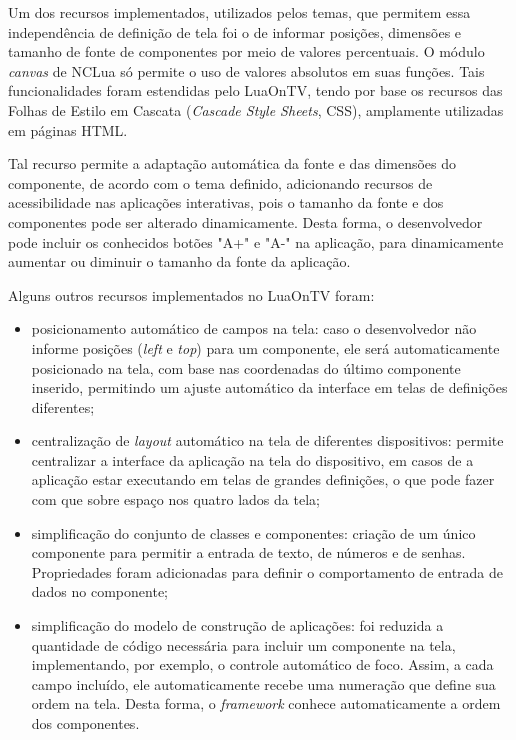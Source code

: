 Um dos recursos implementados, utilizados pelos temas, que permitem essa independência de definição
de tela foi o de informar posições, dimensões e tamanho de fonte de componentes
por meio de valores percentuais. O módulo \textit{canvas} de NCLua só permite 
o uso de valores absolutos em suas funções. Tais funcionalidades foram estendidas
pelo LuaOnTV, tendo por base os recursos das Folhas
de Estilo em Cascata (\textit{Cascade Style Sheets}, CSS)\cite{css2-spec},
amplamente utilizadas em páginas HTML.

Tal recurso permite a adaptação automática da fonte e das dimensões do componente,
de acordo com o tema definido, adicionando recursos de acessibilidade 
nas aplicações interativas, pois o tamanho da fonte e dos componentes
pode ser alterado dinamicamente. Desta forma, o desenvolvedor pode
incluir os conhecidos botões "A+" e "A-"  na aplicação, para dinamicamente
aumentar ou diminuir o tamanho da fonte da aplicação.

Alguns outros recursos implementados no LuaOnTV foram:

\begin{itemize}
	\item posicionamento automático de campos na tela: caso o desenvolvedor não informe posições (\textit{left} e \textit{top})
  para um componente, ele será automaticamente posicionado na tela, com base nas coordenadas do último componente
  inserido, permitindo um ajuste automático da interface em telas de definições diferentes;
  \item centralização de \textit{layout} automático na tela de diferentes dispositivos: permite centralizar
  a interface da aplicação na tela do dispositivo, em casos de a aplicação estar executando em telas
  de grandes definições, o que pode fazer com que sobre espaço nos quatro lados da tela;
  \item simplificação do conjunto de classes e componentes: criação de um único componente
  para permitir a entrada de texto, de números e de senhas. Propriedades foram adicionadas
  para definir o comportamento de entrada de dados no componente;
  \item simplificação do modelo de construção de aplicações: foi reduzida a quantidade de código
  necessária para incluir um componente na tela, implementando, por exemplo, o controle automático 
  de foco. Assim, a cada campo incluído, ele automaticamente recebe uma numeração que define
  sua ordem na tela. Desta forma, o \textit{framework} conhece automaticamente a ordem dos componentes.
\end{itemize}

